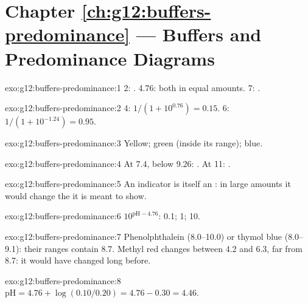 \section*{Chapter \ref{ch:g12:buffers-predominance} --- Buffers and Predominance Diagrams}

\begin{solution}{exo:g12:buffers-predominance:1}
 2: .  4.76: both in equal amounts.  7: .
\end{solution}

\begin{solution}{exo:g12:buffers-predominance:2}
 4: $1/(1 + 10^{0.76}) = 0.15$.  6: $1/(1 + 10^{-1.24}) = 0.95$.
\end{solution}

\begin{solution}{exo:g12:buffers-predominance:3}
Yellow; green (inside its range); blue.
\end{solution}

\begin{solution}{exo:g12:buffers-predominance:4}
At  7.4, below 9.26: . At  11: .
\end{solution}

\begin{solution}{exo:g12:buffers-predominance:5}
An indicator is itself an : in large amounts it would
change the  it is meant to show.
\end{solution}

\begin{solution}{exo:g12:buffers-predominance:6}
$10^{\mathrm{pH} - 4.76}$: 0.1; 1; 10.
\end{solution}

\begin{solution}{exo:g12:buffers-predominance:7}
Phenolphthalein (8.0--10.0) or thymol blue (8.0--9.1): their ranges
contain 8.7. Methyl red changes between 4.2 and 6.3, far from 8.7: it
would have changed long before.
\end{solution}

\begin{solution}{exo:g12:buffers-predominance:8}
$\mathrm{pH} = 4.76 + \log(0.10/0.20) = 4.76 - 0.30 = 4.46$.
\end{solution}

